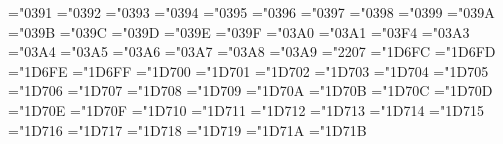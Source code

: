 \Umathcharnumdef\Alpha="0391      \Umathcharnumdef\Beta="0392
\Umathcharnumdef\Gamma="0393      \Umathcharnumdef\Delta="0394
\Umathcharnumdef\Epsilon="0395    \Umathcharnumdef\Zeta="0396
\Umathcharnumdef\Eta="0397        \Umathcharnumdef\varTheta="0398
\Umathcharnumdef\Iota="0399       \Umathcharnumdef\Kappa="039A
\Umathcharnumdef\Lambda="039B     \Umathcharnumdef\Mu="039C
\Umathcharnumdef\Nu="039D         \Umathcharnumdef\Xi="039E
\Umathcharnumdef\Omicron="039F    \Umathcharnumdef\Pi="03A0
\Umathcharnumdef\Rho="03A1        \Umathcharnumdef\Theta="03F4  %
\Umathcharnumdef\Sigma="03A3      \Umathcharnumdef\Tau="03A4
\Umathcharnumdef\Upsilon="03A5    \Umathcharnumdef\Phi="03A6
\Umathcharnumdef\Chi="03A7        \Umathcharnumdef\Psi="03A8
\Umathcharnumdef\Omega="03A9      \Umathcharnumdef\nabla="2207
\Umathcharnumdef\alpha="1D6FC     \Umathcharnumdef\beta="1D6FD
\Umathcharnumdef\gamma="1D6FE     \Umathcharnumdef\delta="1D6FF
\Umathcharnumdef\epsilon="1D700   \Umathcharnumdef\zeta="1D701
\Umathcharnumdef\eta="1D702       \Umathcharnumdef\theta="1D703
\Umathcharnumdef\iota="1D704      \Umathcharnumdef\kappa="1D705
\Umathcharnumdef\lambda="1D706    \Umathcharnumdef\mu="1D707
\Umathcharnumdef\nu="1D708        \Umathcharnumdef\xi="1D709
\Umathcharnumdef\omicron="1D70A   \Umathcharnumdef\pi="1D70B
\Umathcharnumdef\rho="1D70C       \Umathcharnumdef\varsigma="1D70D
\Umathcharnumdef\sigma="1D70E     \Umathcharnumdef\tau="1D70F
\Umathcharnumdef\upsilon="1D710   \Umathcharnumdef\varphi="1D711
\Umathcharnumdef\chi="1D712       \Umathcharnumdef\psi="1D713
\Umathcharnumdef\omega="1D714     \Umathcharnumdef\partial="1D715
\Umathcharnumdef\varepsilon="1D716 \Umathcharnumdef\vartheta="1D717
\Umathcharnumdef\varkappa="1D718   \Umathcharnumdef\phi="1D719
\Umathcharnumdef\varrho="1D71A     \Umathcharnumdef\varpi="1D71B

